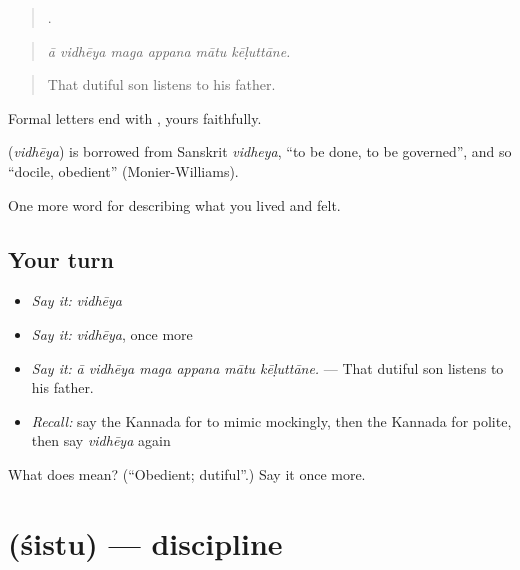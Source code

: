 \begin{quote}
     .
\end{quote}

\begin{quote}
\emph{ā vidhēya maga appana mātu kēḷuttāne.}
\end{quote}

\begin{quote}
That dutiful son listens to his father.
\end{quote}

Formal letters end with  , yours faithfully.

\begin{cousinweb}
\textbf{} (\emph{vidhēya}) is borrowed from Sanskrit \emph{vidheya}, \textquotedblleft{}to be done, to be governed\textquotedblright{}, and so \textquotedblleft{}docile, obedient\textquotedblright{} (Monier-Williams).
\end{cousinweb}

\begin{grammarlens}[title={What you've built}]
One more word for describing what you lived and felt.
\end{grammarlens}

\subsection*{Your turn}
\begin{itemize}
\raggedright
  \item \emph{Say it:} \emph{vidhēya}
  \item \emph{Say it:} \emph{vidhēya}, once more
  \item \emph{Say it:} \emph{ā vidhēya maga appana mātu kēḷuttāne.} — That dutiful son listens to his father.
  \item \emph{Recall:} say the Kannada for to mimic mockingly, then the Kannada for polite, then say \emph{vidhēya} again
\end{itemize}

\begin{tcolorbox}[breakable,colback=teal!4,colframe=teal!35!black,title={Before you move on}]
What does  mean? (\textquotedblleft{}Obedient; dutiful\textquotedblright{}.) Say it once more.
\end{tcolorbox}
\section[\texorpdfstring{\kn{ಶಿಸ್ತು} (śistu)}{ಶಿಸ್ತು (śistu)}]{ (śistu) — discipline}

